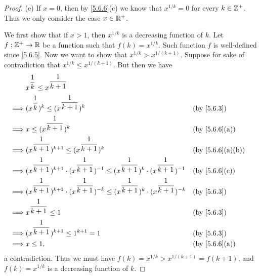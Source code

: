 \begin{proof}{(e)}
  If \(x = 0\), then by \cref{5.6.6}(c) we know that \(x^{1 / k} = 0\) for every \(k \in \mathbb{Z}^+\).
  Thus we only consider the case \(x \in \mathbb{R}^+\).

  We first show that if \(x > 1\), then \(x^{1 / k}\) is a decreasing function of \(k\).
  Let \(f : \mathbb{Z}^+ \to \mathbb{R}\) be a function such that \(f(k) = x^{1 / k}\).
  Such function \(f\) is well-defined since \cref{5.6.5}.
  Now we want to show that \(x^{1 / k} > x^{1 / (k + 1)}\).
  Suppose for sake of contradiction that \(x^{1 / k} \leq x^{1 / (k + 1)}\).
  But then we have
  \begin{align*}
             & x^{\dfrac{1}{k}} \leq x^{\dfrac{1}{k + 1}}                                                                                                                           \\
    \implies & (x^{\dfrac{1}{k}})^k \leq (x^{\dfrac{1}{k + 1}})^k                                                                               &  & \by{5.6.3}                     \\
    \implies & x \leq (x^{\dfrac{1}{k + 1}})^k                                                                                                  &  & \text{(by \cref{5.6.6}(a))}    \\
    \implies & (x^{\dfrac{1}{k + 1}})^{k + 1} \leq (x^{\dfrac{1}{k + 1}})^k                                                                     &  & \text{(by \cref{5.6.6}(a)(b))} \\
    \implies & (x^{\dfrac{1}{k + 1}})^{k + 1} \cdot (x^{\dfrac{1}{k + 1}})^{-1} \leq (x^{\dfrac{1}{k + 1}})^k \cdot (x^{\dfrac{1}{k + 1}})^{-1} &  & \text{(by \cref{5.6.6}(c))}    \\
    \implies & (x^{\dfrac{1}{k + 1}})^{k + 1} \cdot (x^{\dfrac{1}{k + 1}})^{-k} \leq (x^{\dfrac{1}{k + 1}})^k \cdot (x^{\dfrac{1}{k + 1}})^{-k} &  & \by{5.6.3}                     \\
    \implies & x^{\dfrac{1}{k + 1}} \leq 1                                                                                                      &  & \by{5.6.3}                     \\
    \implies & (x^{\dfrac{1}{k + 1}})^{k + 1} \leq 1^{k + 1} = 1                                                                                &  & \by{5.6.3}                     \\
    \implies & x \leq 1,                                                                                                                        &  & \text{(by \cref{5.6.6}(a))}
  \end{align*}
  a contradiction.
  Thus we must have \(f(k) = x^{1 / k} > x^{1 / (k + 1)} = f(k + 1)\), and \(f(k) = x^{1 / k}\) is a decreasing function of \(k\).


\end{proof}
